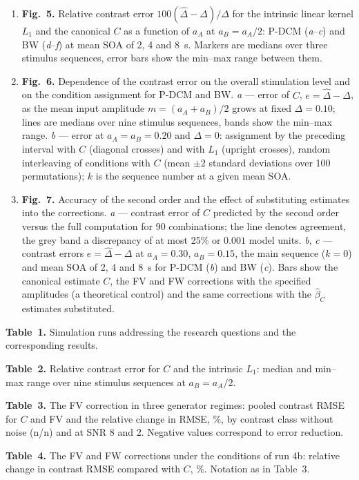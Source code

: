 \documentclass[11pt,twoside,a4paper]{article}
\begin{document}
\begin{enumerate}
\item \textbf{Fig.~5.} Relative contrast error $100(\hat\Delta-\Delta)/\Delta$ for the intrinsic linear kernel $L_1$ and the canonical $C$ as a function of $a_A$ at $a_B=a_A/2$: P-DCM (\textit{a}--\textit{c}) and BW (\textit{d}--\textit{f}) at mean SOA of 2, 4 and 8~s. Markers are medians over three stimulus sequences, error bars show the min--max range between them.
\item \textbf{Fig.~6.} Dependence of the contrast error on the overall stimulation level and on the condition assignment for P-DCM and BW. \textit{a} --- error of $C$, $e=\hat\Delta-\Delta$, as the mean input amplitude $m=(a_A+a_B)/2$ grows at fixed $\Delta=0.10$; lines are medians over nine stimulus sequences, bands show the min--max range. \textit{b} --- error at $a_A=a_B=0.20$ and $\Delta=0$: assignment by the preceding interval with $C$ (diagonal crosses) and with $L_1$ (upright crosses), random interleaving of conditions with $C$ (mean $\pm2$ standard deviations over 100 permutations); $k$ is the sequence number at a given mean SOA.
\item \textbf{Fig.~7.} Accuracy of the second order and the effect of substituting estimates into the corrections. \textit{a} --- contrast error of $C$ predicted by the second order versus the full computation for 90 combinations; the line denotes agreement, the grey band a discrepancy of at most 25\% or $0.001$ model units. \textit{b}, \textit{c} --- contrast errors $e=\hat\Delta-\Delta$ at $a_A=0.30$, $a_B=0.15$, the main sequence ($k=0$) and mean SOA of 2, 4 and 8~s for P-DCM (\textit{b}) and BW (\textit{c}). Bars show the canonical estimate $C$, the FV and FW corrections with the specified amplitudes (a theoretical control) and the same corrections with the $\hat\beta_C$ estimates substituted.
\end{enumerate}

\vspace{0.5\baselineskip}

\vspace{0.5\baselineskip}
\noindent\textbf{Table~1.} Simulation runs addressing the research questions and the corresponding results.

\vspace{2pt}
\noindent\textbf{Table~2.} Relative contrast error for $C$ and the intrinsic $L_1$: median and min--max range over nine stimulus sequences at $a_B=a_A/2$.

\vspace{2pt}
\noindent\textbf{Table~3.} The FV correction in three generator regimes: pooled contrast RMSE for $C$ and FV and the relative change in RMSE, \%, by contrast class without noise (n/n) and at SNR 8 and 2. Negative values correspond to error reduction.

\vspace{2pt}
\noindent\textbf{Table~4.} The FV and FW corrections under the conditions of run 4b: relative change in contrast RMSE compared with $C$, \%. Notation as in Table~3.

\label{lastpage}
\end{document}
